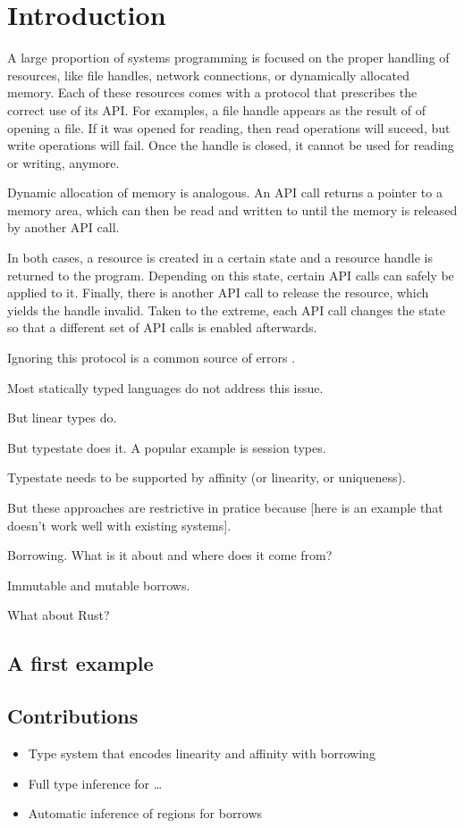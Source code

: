 \section{Introduction}

A large proportion of systems programming is focused on the proper
handling of resources, like file handles, network connections, or
dynamically allocated memory. Each of these resources comes with a
protocol that prescribes the correct use of its API.
For examples, a file handle appears as the result of of opening a
file. If it was opened for reading, then read operations will suceed,
but write operations will fail. Once the handle is closed, it cannot
be used for reading or writing, anymore.

Dynamic allocation of memory is analogous. An API call returns a
pointer to a memory area, which can then be read and written to until
the memory is released by another API call.

In both cases, a resource is created in a certain state and a resource
handle is returned to the program. Depending on this state, certain API calls
can safely be applied to it. Finally, there is another API call to
release the resource, which yields the handle invalid.
Taken to the extreme, each API call changes the state so that a
different set of API calls is enabled afterwards. 

Ignoring this protocol is a common source of errors
.

Most statically typed languages do not address this issue.

But linear types do.

But typestate does it. A popular example is session types.

Typestate needs to be supported by affinity (or linearity, or
uniqueness).

But these approaches are restrictive in pratice because [here is an
example that doesn't work well with existing systems].

Borrowing. What is it about and where does it come from?

Immutable and mutable borrows.

What about Rust?

\subsection{A first example}
\label{sec:first-example}



\subsection{Contributions}
\label{sec:contributions}

\begin{itemize}
\item Type system that encodes linearity and affinity with borrowing
\item Full type inference for \dots
\item Automatic inference of regions for borrows
\end{itemize}

